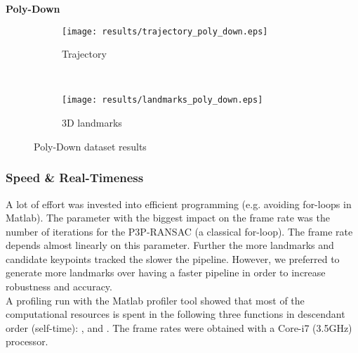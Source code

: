 \textbf{Poly-Down}
\begin{figure*}[ht!]
    \centering
    \begin{subfigure}[t]{0.5\textwidth}
        \centering
        \texttt{[image: results/trajectory\_poly\_down.eps]}
        \caption{Trajectory}
    \end{subfigure}%
    ~ 
    \begin{subfigure}[t]{0.5\textwidth}
        \centering
        \texttt{[image: results/landmarks\_poly\_down.eps]}
        \caption{3D landmarks}
    \end{subfigure}
    \caption{Poly-Down dataset results}
		\label{poly_down_result_fig}
\end{figure*}

\subsubsection{Speed \& Real-Timeness}
A lot of effort was invested into efficient programming (e.g. avoiding for-loops in Matlab). The parameter with the biggest impact on the frame rate was the number of iterations for the P3P-RANSAC (a classical for-loop). The frame rate depends almost linearly on this parameter. Further the more landmarks and candidate keypoints tracked the slower the pipeline. However, we preferred to generate more landmarks over having a faster pipeline in order to increase robustness and accuracy.\\

A profiling run with the Matlab profiler tool showed that most of the computational resources is spent in the following three functions in descendant order (self-time): ,  and . The frame rates were obtained with a Core-i7 (3.5GHz) processor.

